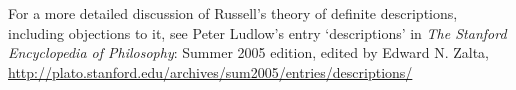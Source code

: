 For a more detailed discussion of Russell's theory of definite descriptions, including objections to it, see Peter Ludlow's entry `descriptions' in \emph{The Stanford Encyclopedia of Philosophy}: Summer 2005 edition, edited by Edward N. Zalta, \url{http://plato.stanford.edu/archives/sum2005/entries/descriptions/}



\practiceproblems







